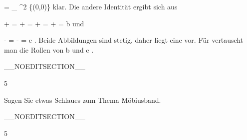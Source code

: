 {\mavergleichskettedisp
{\vergleichskette
{ \varphi \circ \psi
}
{ =} {
_{ \R^2 \setminus \{(0,0)\}  }
}
{ } {
}
{ } {
}
{ } {
}
}
{}{}{}
klar. Die andere Identität ergibt sich aus

\mavergleichskettealign
{\vergleichskettealign
{ {  } + 
}
{ =} { {  } + {  }  
}
{ =} { {  } + {  }  
}
{ =} { {  } + {  }
}
{ =} {b
}
}
{}
{}{}
und

\mavergleichskettedisp
{\vergleichskette
{ {  } - 
}
{ =} { {  } - {  }
}
{ =} { c
}
{ } {}
{ } {}
}
{}{}{.}
Beide Abbildungen sind stetig, daher liegt eine
vor.
Für
 vertauscht man die Rollen von
\mathkor {} {b} {und} {c} {.}

 }

__NOEDITSECTION__

{5}

{

Sagen Sie etwas Schlaues zum Thema Möbiusband.

}
{  }

__NOEDITSECTION__

{5}

